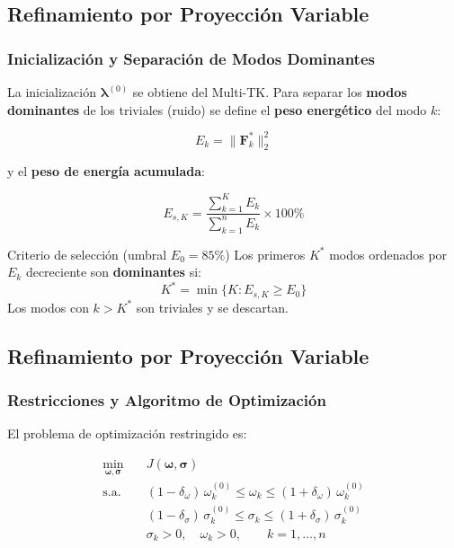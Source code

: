 \subsection{Refinamiento por Proyección Variable}
\subsubsection{Inicialización y Separación de Modos Dominantes}

La inicialización $\bm{\lambda}^{(0)}$ se obtiene del Multi-TK. Para separar los \textbf{modos dominantes} de los triviales (ruido) se define el \textbf{peso energético} del modo $k$:

\begin{equation}
    E_k = \|\mathbf{F}^*_k\|_2^2
    \label{eq:energy_weight}
\end{equation}

y el \textbf{peso de energía acumulada}:

\begin{equation}
    E_{s,K} = \frac{\displaystyle\sum_{k=1}^{K} E_k}{\displaystyle\sum_{k=1}^{n} E_k}
    \times 100\%
    \label{eq:cumulative_energy}
\end{equation}

\begin{block}{Criterio de selección (umbral $E_0 = 85\%$)}
    Los primeros $K^*$ modos ordenados por $E_k$ decreciente son \textbf{dominantes} si:
    \begin{equation}
        K^* = \min\bigl\{K : E_{s,K} \geq E_0\bigr\}
        \label{eq:dominant}
    \end{equation}
    Los modos con $k > K^*$ son triviales y se descartan.
\end{block}


\subsection{Refinamiento por Proyección Variable}
\subsubsection{Restricciones y Algoritmo de Optimización}

El problema de optimización restringido es:

\begin{equation}
    \begin{aligned}
        \min_{\bm{\omega},\bm{\sigma}}\quad & J(\bm{\omega},\bm{\sigma}) \\
        \text{s.a.}\quad
        & (1-\delta_\omega)\,\omega_k^{(0)} \leq \omega_k \leq (1+\delta_\omega)\,\omega_k^{(0)} \\
        & (1-\delta_\sigma)\,\sigma_k^{(0)} \leq \sigma_k \leq (1+\delta_\sigma)\,\sigma_k^{(0)} \\
        & \sigma_k > 0,\quad \omega_k > 0, \qquad k = 1,\ldots,n
    \end{aligned}
    \label{eq:opt_problem}
\end{equation}

